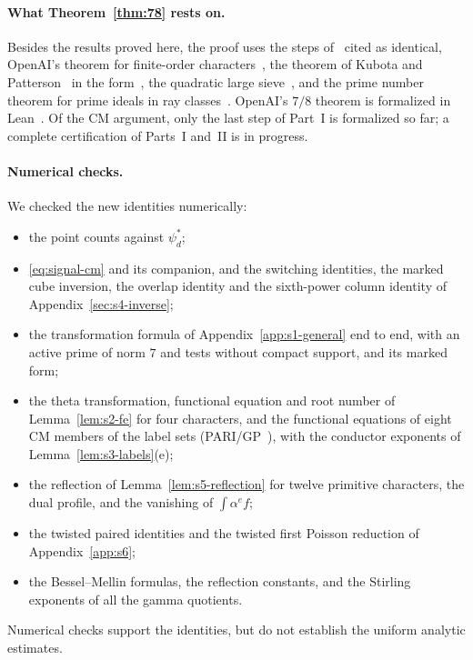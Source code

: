 \documentclass[11pt]{article}
\numberwithin{equation}{section}
\begin{document}
\paragraph{What Theorem~\ref{thm:78} rests on.} Besides the results proved here, the proof uses the steps
of~\cite{OAI78} cited as identical, OpenAI's theorem for finite-order
characters~\cite[Theorem~1.1]{OAI78}, the theorem of Kubota and Patterson~\cite{Kub69,Pat77} in the form~\cite[Theorem~23]{QF}, the
quadratic large sieve~\cite{HB95,GL}, and the prime number theorem for prime ideals in ray classes~\cite{Hec17,Hec20}. OpenAI's
$7/8$ theorem is formalized in Lean~\cite{OAIlean}. Of the CM argument, only the last step of Part~I is
formalized so far; a complete certification of Parts~I and~II
is in progress.

\paragraph{Numerical checks.} We checked the new identities numerically:
\begin{itemize}
\item the point counts against $\psi_d^*$;
\item \eqref{eq:signal-cm} and its companion, and the switching identities, the marked cube inversion, the overlap
 identity and the sixth-power column identity of Appendix~\ref{sec:s4-inverse};
\item the transformation formula of Appendix~\ref{app:s1-general} end to end, with an active prime of norm $7$ and
 tests without compact support, and its marked form;
\item the theta transformation, functional equation and root number of Lemma~\ref{lem:s2-fe} for four characters,
 and the functional equations of eight CM members of the label sets (PARI/GP~\cite{PARI}), with the conductor exponents of
 Lemma~\ref{lem:s3-labels}(e);
\item the reflection of Lemma~\ref{lem:s5-reflection} for twelve primitive characters, the dual profile, and the
 vanishing of $\int\alpha^ef$;
\item the twisted paired identities and the twisted first Poisson reduction of Appendix~\ref{app:s6};
\item the Bessel--Mellin formulas, the reflection constants, and the Stirling exponents of all the gamma quotients.
\end{itemize}
Numerical checks support the identities, but do not establish the uniform analytic estimates.
\end{document}
